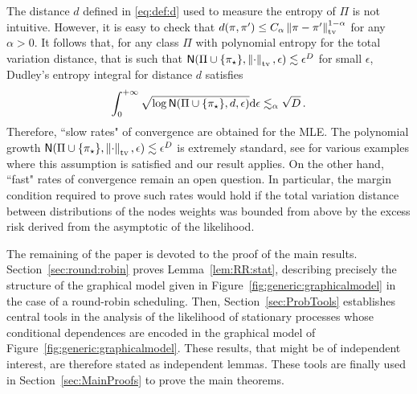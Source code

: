 The distance $d$ defined in \eqref{eq:def:d} used to measure the entropy of $\Pi$ is not intuitive. However, it is easy to check that $d(\pi,\pi')\le C_\alpha\left\|\pi-\pi'\right\|_{\text{tv}}^{1-\alpha}$ for any $\alpha>0$. It follows that, for any class $\Pi$ with polynomial entropy for the total variation distance, that is such that $\mathsf{N}(\Pi\cup\{\pi_{\star}\},\left\|\cdot\right\|_{\text{tv}},\epsilon)\lesssim \epsilon^D$ for small $\epsilon$, Dudley's entropy integral for distance $d$ satisfies 
\[
\int_0^{+\infty}\sqrt{\log \mathsf{N}(\Pi\cup\{\pi_{\star}\},d,\epsilon)}\mathrm{d}\epsilon\lesssim_{\alpha} \sqrt{D}\,.
\]
Therefore, ``slow rates" of convergence are obtained for the MLE. The polynomial growth $\mathsf{N}(\Pi\cup\{\pi_{\star}\},\left\|\cdot\right\|_{\text{tv}},\epsilon)\lesssim \epsilon^D$ is extremely standard, see \cite[p271--274]{MR1652247} for various examples where this assumption is satisfied and our result applies. 
On the other hand, ``fast" rates of convergence remain an open question. 
In particular, the margin condition \cite{MR1765618} required to prove such rates would hold if the total variation distance between distributions of the nodes weights was bounded from above by the excess risk derived from the asymptotic of the likelihood. 




The remaining of the paper is devoted to the proof of the main results. Section~\ref{sec:round:robin} proves Lemma~\ref{lem:RR:stat}, describing precisely the structure of the graphical model given in Figure~\ref{fig:generic:graphicalmodel} in the case of a round-robin scheduling. Then, Section~\ref{sec:ProbTools} establishes central tools in the analysis of the likelihood of stationary processes whose conditional dependences are encoded in the graphical model of Figure~\ref{fig:generic:graphicalmodel}. These results, that might be of independent interest, are therefore stated as independent lemmas.  These tools are finally used in Section~\ref{sec:MainProofs} to prove the main theorems.

